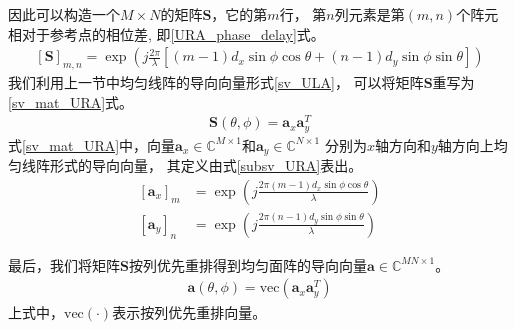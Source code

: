 \documentclass[master]{thesis-uestc}
\begin{document}
因此可以构造一个$M \times N$的矩阵$\bm{S}$，它的第$m$行，
第$n$列元素是第$(m,n)$个阵元相对于参考点的相位差,
即\eqref{URA_phase_delay}式。
\begin{equation}\label{URA_phase_delay}
    \begin{aligned}
        \left[\bm{S}\right]_{m,n} = 
        \exp\left(j\frac{2\pi}{\lambda}
                  \left[(m-1)d_x\sin\phi\cos\theta + (n-1)d_y\sin\phi\sin\theta\right]\right)
    \end{aligned}
\end{equation}
我们利用上一节中均匀线阵的导向向量形式\eqref{sv_ULA}，
可以将矩阵$\bm{S}$重写为\eqref{sv_mat_URA}式。
\begin{equation}\label{sv_mat_URA}
    \begin{aligned}
        \bm{S}(\theta,\phi) = \bm{a}_x\bm{a}^T_y
    \end{aligned}
\end{equation}
式\eqref{sv_mat_URA}中，向量$\bm{a}_x\in\mathbb{C}^{M\times1}$和$\bm{a}_y\in\mathbb{C}^{N\times1}$
分别为$x$轴方向和$y$轴方向上均匀线阵形式的导向向量，
其定义由式\eqref{subsv_URA}表出。
\begin{subequations}\label{subsv_URA}
    \begin{align}
        \left[\bm{a}_x\right]_{m} &= 
        \exp\left(j\frac{2\pi(m-1)d_x\sin\phi\cos\theta}{\lambda}\right)
        \\
        \left[\bm{a}_y\right]_{n} &= 
        \exp\left(j\frac{2\pi(n-1)d_y\sin\phi\sin\theta}{\lambda}\right)
    \end{align}
\end{subequations}

最后，我们将矩阵$\bm{S}$按列优先重排得到均匀面阵的导向向量$\bm{a}\in\mathbb{C}^{MN\times1}$。
\begin{equation}\label{sv_URA}
    \begin{aligned}
        \bm{a}(\theta,\phi) = \text{vec}\left(\bm{a}_x\bm{a}_y^T\right)
    \end{aligned}
\end{equation}
上式中，$\text{vec}(\cdot)$表示按列优先重排向量。
\end{document}
